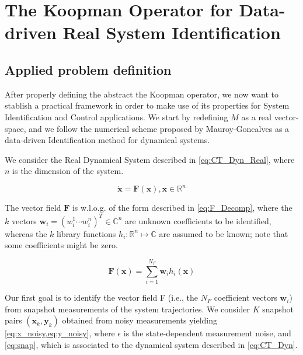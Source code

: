 \documentclass{article}
\begin{document}
\begin{comment}
    By taking advantage of this linearity, we can now make use of eigenfunction decomposition in order to obtain further information from the defined operator. We call $\phi : M \mapsto \mathbb{C}$ an eigenfunction of the Koopman operator $U$, associated to an eigenvalue $\lambda \in \mathbb{C}$.
\end{comment}

\section{The Koopman Operator for Data-driven Real System Identification}

    \subsection{Applied problem definition}

        After properly defining the abstract the Koopman operator, we now want to stablish a practical framework in order to make use of its properties for System Identification and Control applications. We start by redefining $M$ as a real vector-space, and we follow the numerical scheme proposed by Mauroy-Goncalves\cite{Goncalves} as a data-driven Identification method for dynamical systems.
        
        We consider the Real Dynamical System described in \cref{eq:CT_Dyn_Real}, where $n$ is the dimension of the system. 

        \begin{equation} \label{eq:CT_Dyn_Real}
            \dot{\mathbf{x}} = \mathbf{F}\left(\mathbf{x}\right), \mathbf{x} \in \mathbb{R}^n
        \end{equation}

        The vector field $\mathbf{F}$ is w.l.o.g. of the form described in \cref{eq:F_Decomp}, where the $k$ vectors $\mathbf{w}_i = \left( w_i^1 \cdots w_i^n \right)^T \in \mathbb{C}^n$ are unknown coefficients to be identified, whereas the $k$ library functions $h_i : \mathbb{R}^n \mapsto \mathbb{C}$ are assumed to be known; note that some coefficients might be zero.

        \begin{equation} \label{eq:F_Decomp}
            \mathbf{F}(\mathbf{x}) = \sum_{i = 1}^{N_F} \mathbf{w}_i h_i \left( \mathbf{x} \right)
        \end{equation}

        Our first goal is to identify the vector field F (i.e., the $N_F$ coefficient vectors $\mathbf{w}_i$) from snapshot measurements of the system trajectories. We consider $K$ snapshot pairs $\left(\mathbf{x}_k,\mathbf{y}_k\right)$ obtained from noisy measurements yielding \cref{eq:x_noisy,eq:y_noisy}, where $\epsilon$ is the state-dependent measurement noise, and \cref{eq:snap}, which is associated to the dynamical system described in \cref{eq:CT_Dyn}.
\end{document}
